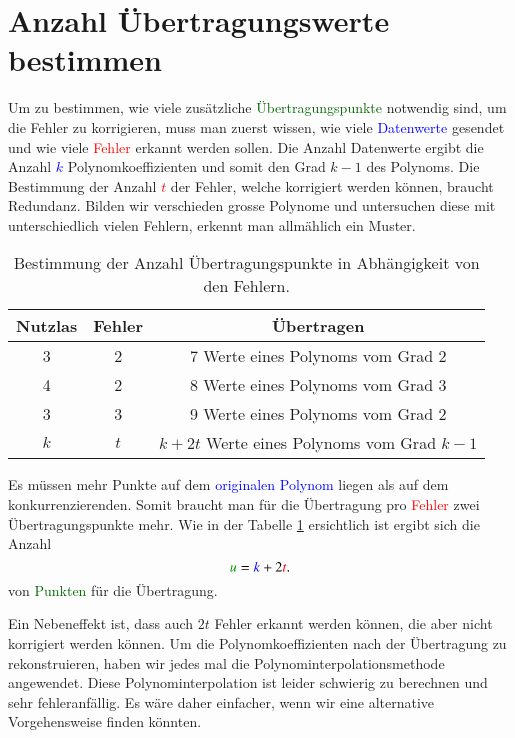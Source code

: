 \section{Anzahl Übertragungswerte bestimmen
\label{reedsolomon:section:Fehlerkorrekturstellen}}
Um zu bestimmen, wie viele zusätzliche \textcolor{darkgreen}{Übertragungspunkte} notwendig sind, um die Fehler zu korrigieren,
    muss man zuerst wissen, wie viele \textcolor{blue}{Datenwerte} gesendet und wie viele \textcolor{red}{Fehler} erkannt werden sollen. 
Die Anzahl Datenwerte ergibt die Anzahl
\textcolor{blue}{$k$}
Polynomkoeffizienten
und somit den Grad $k-1$ des Polynoms.
Die Bestimmung der Anzahl \textcolor{red}{$t$} der Fehler, welche korrigiert werden können, braucht Redundanz.
Bilden wir verschieden grosse Polynome und untersuchen diese mit unterschiedlich vielen Fehlern, erkennt man allmählich ein Muster.

\begin{table}%
    \centering
    \begin{tabular}{ c c | c} 
        \hline
        Nutzlas & Fehler & Übertragen \\
        \hline 
        3 & 2 & 7 Werte eines Polynoms vom Grad 2 \\ 
        4 & 2 & 8 Werte eines Polynoms vom Grad 3 \\
        3 & 3 & 9 Werte eines Polynoms vom Grad 2 \\ 
        \hline
        $k$ & $t$ & $k+2t$ Werte eines Polynoms vom Grad $k-1$ \\ 
        \hline
    \end{tabular}
    \caption{Bestimmung der Anzahl Übertragungspunkte in Abhängigkeit von den Fehlern.}
    \label{tab:fehlerkorrekturstellen}
\end{table}
\par 
Es müssen mehr Punkte auf dem \textcolor{blue}{originalen Polynom} liegen als auf dem konkurrenzierenden.
Somit braucht man für die Übertragung pro \textcolor{red}{Fehler} zwei Übertragungspunkte mehr.
Wie in der Tabelle \ref{tab:fehlerkorrekturstellen} ersichtlich ist ergibt sich die
Anzahl
\begin{equation}
    \textcolor{darkgreen}{u}=
    \textcolor{blue}{k}+2\textcolor{red}{t}.
    \label{reedsolomon:equation2}
\end{equation}
von \textcolor{darkgreen}{Punkten} für die Übertragung.

Ein Nebeneffekt ist, dass auch $2t$ Fehler erkannt werden können, die aber nicht korrigiert werden können.
Um die Polynomkoeffizienten nach der Übertragung zu rekonstruieren, haben wir jedes mal die Polynominterpolationsmethode angewendet.
Diese Polynominterpolation ist leider schwierig zu berechnen und sehr fehleranfällig.
Es wäre daher einfacher, wenn wir eine alternative Vorgehensweise finden könnten. 


